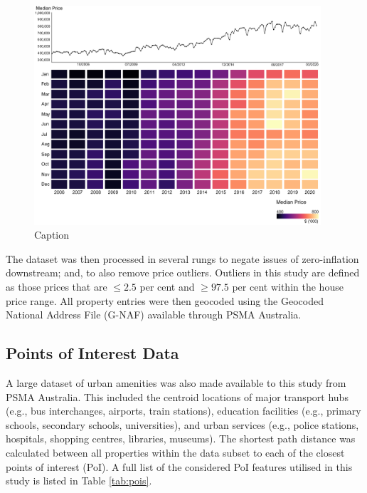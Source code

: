\begin{figure}[!ht]
    \centering
    \includegraphics[width=0.95\textwidth]{body/figures/house_price_data.png}
    \caption{Caption}
    \label{fig:house_price}
\end{figure}

The dataset was then processed in several rungs to negate issues of zero-inflation downstream; and, to also remove price outliers. Outliers in this study are defined as those prices that are $\leq 2.5$ per cent and $\geq 97.5$ per cent within the house price range. All property entries were then geocoded using the Geocoded National Address File (G-NAF) available through PSMA Australia.\\ %


\subsection{Points of Interest Data}

A large dataset of urban amenities was also made available to this study from PSMA Australia. This included the centroid locations of major transport hubs (e.g., bus interchanges, airports, train stations), education facilities (e.g., primary schools, secondary schools, universities), and urban services (e.g., police stations, hospitals, shopping centres, libraries, museums). The shortest path distance was calculated between all properties within the data subset to each of the closest points of interest (PoI). A full list of the considered PoI features utilised in this study is listed in Table \ref{tab:pois}.\\

